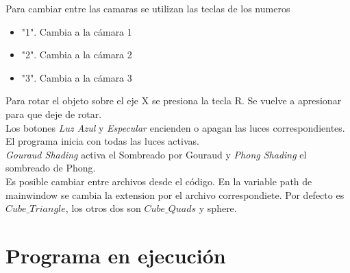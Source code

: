 \documentclass[12pt]{article}
\begin{document}
Para cambiar entre las camaras se utilizan las teclas de los numeros
\begin{itemize}
\item "1". Cambia a la cámara 1
\item "2". Cambia a la cámara 2
\item "3". Cambia a la cámara 3

\end{itemize}

 

Para rotar el objeto sobre el eje X se presiona la tecla R. Se vuelve a apresionar para que deje de rotar.
\\

Los botones \textit{Luz Azul} y \textit{Especular} encienden o apagan las luces correspondientes. El programa inicia con todas las luces activas.
\\

\textit{Gouraud Shading} activa el Sombreado por Gouraud y \textit{Phong Shading} el sombreado de Phong.
\\

Es posible cambiar entre archivos desde el código. En la variable path de mainwindow se cambia la extension por el archivo correspondiete. Por defecto es $Cube\_Triangle$, los otros dos son $Cube\_Quads$ y sphere.



\section{Programa en ejecución}
\end{document}
